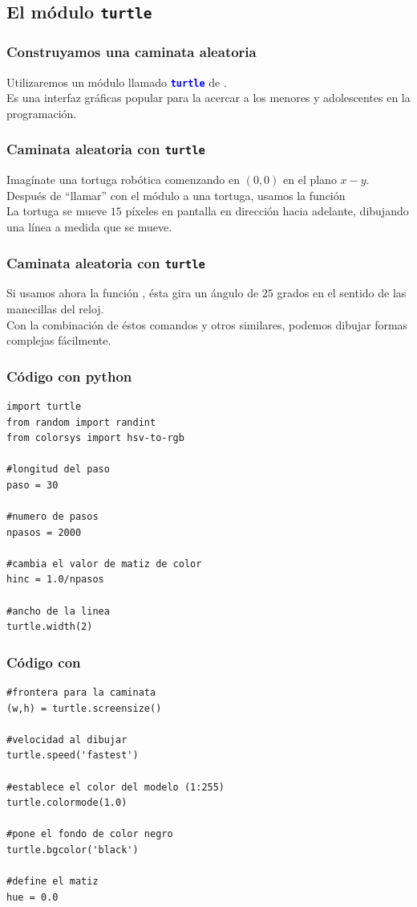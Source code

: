 \subsection{El módulo \texttt{turtle}}
\begin{frame}
\frametitle{Construyamos una caminata aleatoria}
Utilizaremos un módulo llamado \textcolor{blue}{\textbf{\texttt{turtle}}} de \python.
\\
\bigskip
Es una interfaz gráficas popular para la acercar a los menores y adolescentes en la programación.
\end{frame}
\begin{frame}
\frametitle{Caminata aleatoria con \texttt{turtle}}
Imagínate una tortuga robótica comenzando en $(0, 0)$ en el plano $x-y$.
\\
\bigskip
Después de \enquote{llamar} con el módulo a una tortuga, usamos la función 
\\
\bigskip
\pause
La tortuga se mueve $15$ píxeles en pantalla en dirección hacia adelante, dibujando una línea a medida que se mueve.
\end{frame}
\begin{frame}
\frametitle{Caminata aleatoria con \texttt{turtle}}
Si usamos ahora la función , ésta gira un ángulo de $25$ grados en el sentido de las manecillas del reloj.
\\
\bigskip
Con la combinación de éstos comandos y otros similares, podemos dibujar formas complejas fácilmente.
\end{frame}
\begin{frame}
\frametitle{Código con python}
\begin{lstlisting}[caption=Definición del espacio de trabajo, style=FormattedNumber, basicstyle=\linespread{1.1}\ttfamily=\small, columns=fullflexible]
import turtle
from random import randint
from colorsys import hsv-to-rgb

#longitud del paso
paso = 30

#numero de pasos
npasos = 2000

#cambia el valor de matiz de color
hinc = 1.0/npasos

#ancho de la linea
turtle.width(2)
\end{lstlisting}
\end{frame}
\begin{frame}
\frametitle{Código con \python}
\begin{lstlisting}[caption=Aspecto gráfico del entorno, style=FormattedNumber, basicstyle=\linespread{1.1}\ttfamily=\small, columns=fullflexible]
#frontera para la caminata
(w,h) = turtle.screensize()

#velocidad al dibujar
turtle.speed('fastest')

#establece el color del modelo (1:255)
turtle.colormode(1.0)

#pone el fondo de color negro
turtle.bgcolor('black')

#define el matiz
hue = 0.0
\end{lstlisting}
\end{frame}
